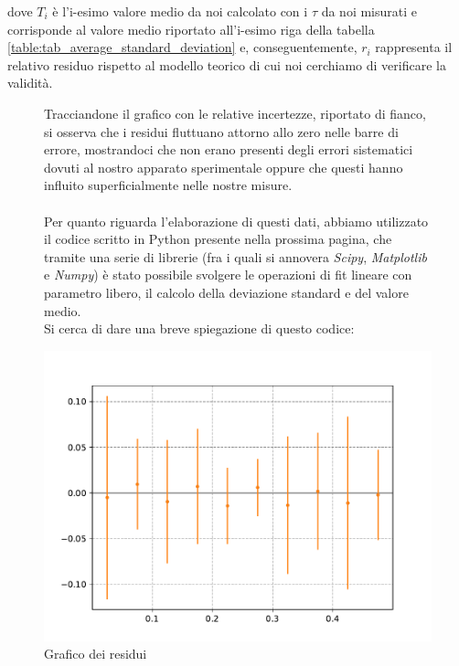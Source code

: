 \documentclass{article}
\begin{document}
dove $T_i$ è l'i-esimo valore medio da noi calcolato con i $\tau$ da noi misurati e corrisponde al valore medio riportato all'i-esimo riga della tabella \ref{table:tab_average_standard_deviation} e, conseguentemente, $r_i$ rappresenta il relativo residuo rispetto al modello teorico di cui noi cerchiamo di verificare la validità. 
\begin{figure}[h!tbp]
	\begin{minipage}{0.6\textwidth}
	\noindent Tracciandone il grafico con le relative incertezze, riportato di fianco, si osserva che i residui fluttuano attorno allo zero nelle barre di errore, mostrandoci che non erano presenti degli errori sistematici dovuti al nostro apparato sperimentale oppure che questi hanno influito superficialmente nelle nostre misure. \\ \\
	Per quanto riguarda l'elaborazione di questi dati, abbiamo utilizzato il codice scritto in Python presente nella prossima pagina, che tramite una serie di librerie (fra i quali si annovera \textit{Scipy}, \textit{Matplotlib} e \textit{Numpy}) è stato possibile svolgere le operazioni di fit lineare con parametro libero, il calcolo della deviazione standard e del valore medio.\\	
	Si cerca di dare una breve spiegazione di questo codice:
	\end{minipage}
	\hspace{-0.04\textwidth}
	\begin{minipage}{0.5\textwidth}
		\vspace{-0.5cm}
		\centering			
			\includegraphics[scale=0.45]{grafico_residui.pdf}
			\caption{Grafico dei residui}\label{fig:grafico_residui}
	\end{minipage}
\end{figure} \\ 
\end{document}
